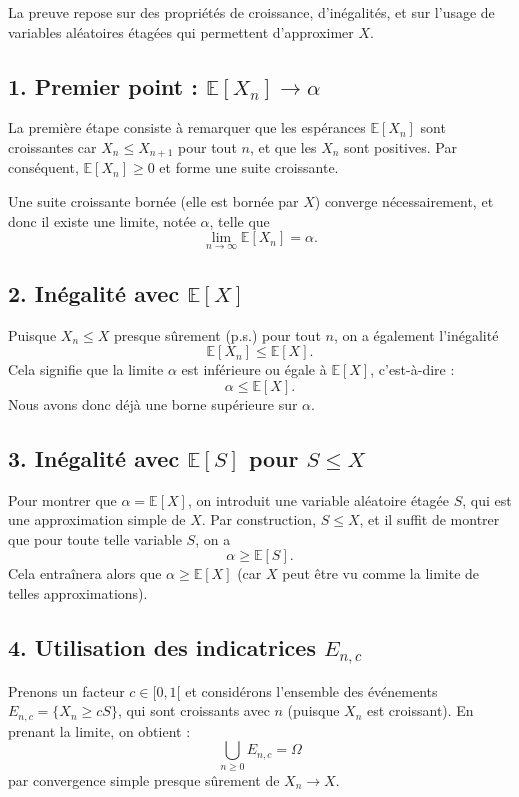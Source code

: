 La preuve repose sur des propriétés de croissance, d'inégalités, et sur l'usage de variables aléatoires étagées qui permettent d'approximer $X$.

\subsection*{1. Premier point : $\mathbb{E}[X_n] \to \alpha$}

La première étape consiste à remarquer que les espérances $\mathbb{E}[X_n]$ sont croissantes car $X_n \leq X_{n+1}$ pour tout $n$, et que les $X_n$ sont positives. Par conséquent, $\mathbb{E}[X_n] \geq 0$ et forme une suite croissante. 

Une suite croissante bornée (elle est bornée par $X$) converge nécessairement, et donc il existe une limite, notée $\alpha$, telle que
\[
\lim_{n \to \infty} \mathbb{E}[X_n] = \alpha.
\]

\subsection*{2. Inégalité avec $\mathbb{E}[X]$}

Puisque $X_n \leq X$ presque sûrement (p.s.) pour tout $n$, on a également l'inégalité
\[
\mathbb{E}[X_n] \leq \mathbb{E}[X].
\]
Cela signifie que la limite $\alpha$ est inférieure ou égale à $\mathbb{E}[X]$, c'est-à-dire :
\[
\alpha \leq \mathbb{E}[X].
\]
Nous avons donc déjà une borne supérieure sur $\alpha$.

\subsection*{3. Inégalité avec $\mathbb{E}[S]$ pour $S \leq X$}

Pour montrer que $\alpha = \mathbb{E}[X]$, on introduit une variable aléatoire étagée $S$, qui est une approximation simple de $X$. Par construction, $S \leq X$, et il suffit de montrer que pour toute telle variable $S$, on a
\[
\alpha \geq \mathbb{E}[S].
\]
Cela entraînera alors que $\alpha \geq \mathbb{E}[X]$ (car $X$ peut être vu comme la limite de telles approximations).

\subsection*{4. Utilisation des indicatrices $E_{n,c}$}

Prenons un facteur $c \in [0,1[$ et considérons l'ensemble des événements $E_{n,c} = \{X_n \geq cS\}$, qui sont croissants avec $n$ (puisque $X_n$ est croissant). En prenant la limite, on obtient :
\[
\bigcup_{n \geq 0} E_{n,c} = \Omega
\]
par convergence simple presque sûrement de $X_n \to X$.

